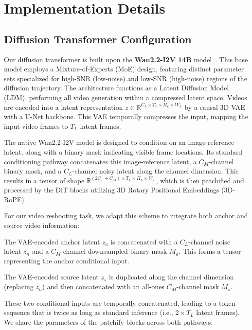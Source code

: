 \section{Implementation Details}
\subsection{Diffusion Transformer Configuration}
\label{sec:diffusion_transformer_config}

Our diffusion transformer is built upon the \textbf{Wan2.2-I2V 14B} model~\cite{wan21}. This base model employs a Mixture-of-Experts (MoE) design, featuring distinct parameter sets specialized for high-SNR (low-noise) and low-SNR (high-noise) regions of the diffusion trajectory. The architecture functions as a Latent Diffusion Model (LDM), performing all video generation within a compressed latent space. Videos are encoded into a latent representation $z \in \mathbb{R}^{C_L \times T_L \times H_L \times W_L}$ by a causal 3D VAE with a U-Net backbone. This VAE temporally compresses the input, mapping the input video frames to $T_L$ latent frames.

The native Wan2.2-I2V model is designed to condition on an image-reference latent, along with a binary mask indicating visible frame locations. Its standard conditioning pathway concatenates this image-reference latent, a $C_M$-channel binary mask, and a $C_L$-channel noisy latent along the channel dimension. This results in a tensor of shape $\mathbb{R}^{(2C_L + C_M) \times T_L \times H_L \times W_L}$, which is then patchified and processed by the DiT blocks utilizing 3D Rotary Positional Embeddings (3D-RoPE).

For our video reshooting task, we adapt this scheme to integrate both anchor and source video information:
\begin{description}[noitemsep, topsep=0pt, partopsep=0pt, leftmargin=1em, style=unboxed, font=\normalfont\bfseries]
    \item[Anchor Conditioning Stream] The VAE-encoded anchor latent $z_a$ is concatenated with a $C_L$-channel noise latent $z_n$ and a $C_M$-channel downsampled binary mask $M_a$. This forms a tensor representing the anchor conditional input.
    \item[Source Conditioning Stream] The VAE-encoded source latent $z_s$ is duplicated along the channel dimension (replacing $z_n$) and then concatenated with an all-ones $C_M$-channel mask $M_s$. 
\end{description}
These two conditional inputs are temporally concatenated, leading to a token sequence that is twice as long as standard inference (i.e., $2 \times T_L$ latent frames). We share the parameters of the patchify blocks across both pathways.

